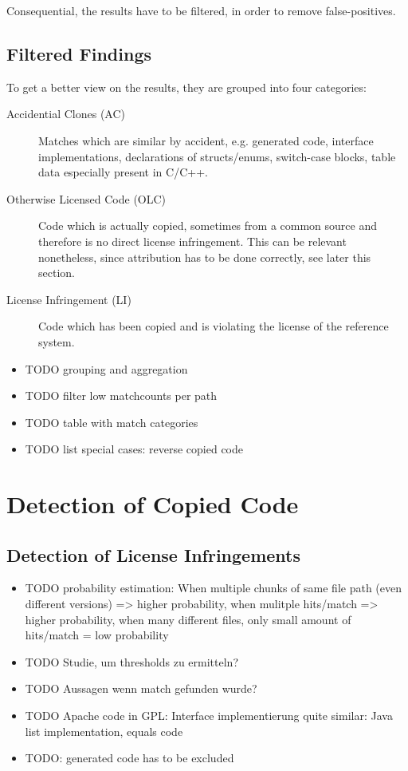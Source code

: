 Consequential, the results have to be filtered, in order to remove false-positives.

\subsection{Filtered Findings}
To get a better view on the results, they are grouped into four categories:
\begin{description}
	\item [Accidential Clones (AC)]
		Matches which are similar by \glqq accident\grqq, e.g. generated code, interface implementations, declarations of structs/enums, switch-case blocks, table data especially present in C/C++.
	\item[Otherwise Licensed Code (OLC)]
		Code which is actually copied, sometimes from a common source and therefore is no direct license infringement.
		This can be relevant nonetheless, since attribution has to be done correctly, see later this section. %
	\item[License Infringement (LI)]
		Code which has been copied and is violating the license of the reference system.
\end{description}

\begin{itemize}
	\item TODO grouping and aggregation
	\item TODO filter low matchcounts per path
	\item TODO table with match categories
	\item TODO list special cases: reverse copied code
\end{itemize}


\section{Detection of Copied Code} %
\subsection{Detection of License Infringements} %
\begin{itemize}
	\item TODO probability estimation: When multiple chunks of same file path (even different versions) => higher probability, when mulitple hits/match => higher probability, when many different files, only small amount of hits/match = low probability
	\item TODO Studie, um thresholds zu ermitteln?
	\item TODO Aussagen wenn match gefunden wurde?
	\item TODO Apache code in GPL: Interface implementierung quite similar: Java list implementation, equals code 
	\item TODO: generated code has to be excluded
\end{itemize}

